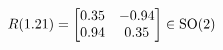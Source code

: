 \documentclass[preview]{standalone}
\begin{document}
\begin{align*}
\special{dvisvgm:raw <g id='unique000'>}R(1.21) = \begin{bmatrix} 0.35 & -0.94 \\ 0.94 & 0.35 \end{bmatrix} \in \text{SO}(2)\special{dvisvgm:raw </g>}
\end{align*}
\end{document}
